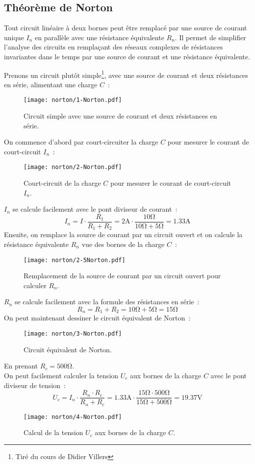 \subsection{Th\'eor\`eme de Norton}
Tout circuit lin\'eaire à deux bornes peut \^etre remplac\'e par une source de courant unique \(I_{n}\) en parall\`ele avec une r\'esistance \'equivalente \(R_{n}\). Il permet de simplifier l'analyse des circuits en remplaçant des r\'eseaux complexes de r\'esistances invariantes dans le temps par une source de courant et une r\'esistance \'equivalente.\par
Prenons un circuit plut\^ot simple\footnote{Tir\'e du cours de Didier Villers}, avec une source de courant et deux r\'esistances en s\'erie, alimentant une charge \(C\)~:
\begin{figure}[H]
    \centering
    \texttt{[image: norton/1-Norton.pdf]}
    \caption{Circuit simple avec une source de courant et deux r\'esistances en s\'erie.}
\end{figure}
On commence d'abord par court-circuiter la charge \(C\) pour mesurer le courant de court-circuit \(I_{n}\)~:
\begin{figure}[H]
    \centering
    \texttt{[image: norton/2-Norton.pdf]}
    \caption{Court-circuit de la charge \(C\) pour mesurer le courant de court-circuit \(I_{n}\).}
\end{figure}
\(I_{n}\) se calcule facilement avec le pont diviseur de courant~:
\[
I_{n} = I \cdot \frac{R_1}{R_1 + R_2} = 2\unit{\ampere} \cdot \frac{10\unit{\ohm}}{10\unit{\ohm} + 5\unit{\ohm}} = 1.33\unit{\ampere}
\]
Ensuite, on remplace la source de courant par un circuit ouvert et on calcule la r\'esistance \'equivalente \(R_{n}\) vue des bornes de la charge \(C\)~:
\begin{figure}[H]
    \centering
    \texttt{[image: norton/2-5Norton.pdf]}
    \caption{Remplacement de la source de courant par un circuit ouvert pour calculer \(R_{n}\).}
\end{figure}
\(R_{n}\) se calcule facilement avec la formule des r\'esistances en s\'erie~:
\[
R_{n} = R_{1} + R_{2} = 10\unit{\ohm} + 5\unit{\ohm} = 15\unit{\ohm}
\]
On peut maintenant dessiner le circuit \'equivalent de Norton~:
\begin{figure}[H]
    \centering
    \texttt{[image: norton/3-Norton.pdf]}
    \caption{Circuit \'equivalent de Norton.}
    \label{fig:norton-equivalent}
\end{figure}
En prenant \(R_c=500\unit{\ohm}\).\\
On peut facilement calculer la tension \(U_{c}\) aux bornes de la charge \(C\) avec le pont diviseur de tension~:
\[
U_{c} = I_{n} \cdot \frac{R_{n} \cdot R_{c}}{R_{n} + R_{c}} = 1.33\unit{\ampere} \cdot \frac{15\unit{\ohm} \cdot 500\unit{\ohm}}{15\unit{\ohm} + 500\unit{\ohm}} = 19.37\unit{\volt}
\]
\begin{figure}[H]
	\centering
    \texttt{[image: norton/4-Norton.pdf]}
    \caption{Calcul de la tension \(U_{c}\) aux bornes de la charge \(C\).}
\end{figure}

